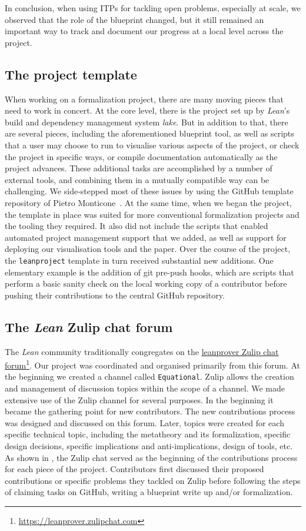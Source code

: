 In conclusion, when using ITPs for tackling open problems, especially at scale, we observed that the role of the blueprint changed, but it still remained an important way to track and document our progress at a local level across the project.

\subsection{The project template}
When working on a formalization project, there are many moving pieces that need to work in concert. At the core level, there is the project set up by \emph{Lean}'s build and dependency management system \emph{lake}. But in addition to that, there are several pieces, including the aforementioned blueprint tool, as well as scripts that a user may choose to run to visualise various aspects of the project, or check the project in specific ways, or compile documentation automatically as the project advances. These additional tasks are accomplished by a number of external tools, and combining them in a mutually compatible way can be challenging. We side-stepped most of these issues by using the GitHub template repository of Pietro Monticone~\cite{Monticone_LeanProject_2025}. At the same time, when we began the project, the template in place was suited for more conventional formalization projects and the tooling they required. It also did not include the scripts that enabled automated project management support that we added, as well as support for deploying our visualisation tools and the paper. Over the course of the project, the \texttt{leanproject} template in turn received substantial new additions. One elementary example is the addition of git pre-push hooks, which are scripts that perform a basic sanity check on the local working copy of a contributor before pushing their contributions to the central GitHub repository.

\subsection{The \emph{Lean} Zulip chat forum}
The \emph{Lean} community traditionally congregates on the \href{https://leanprover.zulipchat.com}{leanprover Zulip chat forum}\footnote{\url{https://leanprover.zulipchat.com}}. Our project was coordinated and organised primarily from this forum. At the beginning we created a channel called \texttt{Equational}. Zulip allows the creation and management of discussion topics within the scope of a channel. We made extensive use of the Zulip channel for several purposes. In the beginning it became the gathering point for new contributors. The new contributions process was designed and discussed on this forum. Later, topics were created for each specific technical topic, including the metatheory and its formalization, specific design decisions, specific implications and anti-implications, design of tools, etc. As shown in , the Zulip chat served as the beginning of the contributions process for each piece of the project. Contributors first discussed their proposed contributions or specific problems they tackled on Zulip before following the steps of claiming tasks on GitHub, writing a blueprint write up and/or formalization.

